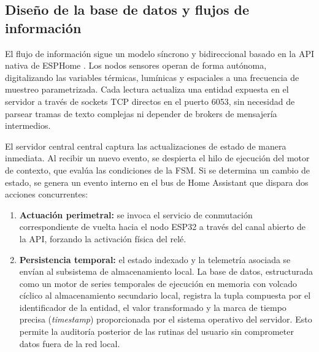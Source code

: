 \subsection{Diseño de la base de datos y flujos de información}
El flujo de información sigue un modelo síncrono y bidireccional basado en la API nativa de ESPHome \cite{al2015internet}. Los nodos sensores operan de forma autónoma, digitalizando las variables térmicas, lumínicas y espaciales a una frecuencia de muestreo parametrizada. Cada lectura actualiza una entidad expuesta en el servidor a través de sockets TCP directos en el puerto 6053, sin necesidad de parsear tramas de texto complejas ni depender de brokers de mensajería intermedios.

El servidor central central captura las actualizaciones de estado de manera inmediata. Al recibir un nuevo evento, se despierta el hilo de ejecución del motor de contexto, que evalúa las condiciones de la FSM. Si se determina un cambio de estado, se genera un evento interno en el bus de Home Assistant que dispara dos acciones concurrentes:
\begin{enumerate}
    \item \textbf{Actuación perimetral:} se invoca el servicio de conmutación correspondiente de vuelta hacia el nodo ESP32 a través del canal abierto de la API, forzando la activación física del relé.
    \item \textbf{Persistencia temporal:} el estado indexado y la telemetría asociada se envían al subsistema de almacenamiento local. La base de datos, estructurada como un motor de series temporales de ejecución en memoria con volcado cíclico al almacenamiento secundario local, registra la tupla compuesta por el identificador de la entidad, el valor transformado y la marca de tiempo precisa (\textit{timestamp}) proporcionada por el sistema operativo del servidor. Esto permite la auditoría posterior de las rutinas del usuario sin comprometer datos fuera de la red local.
\end{enumerate}

